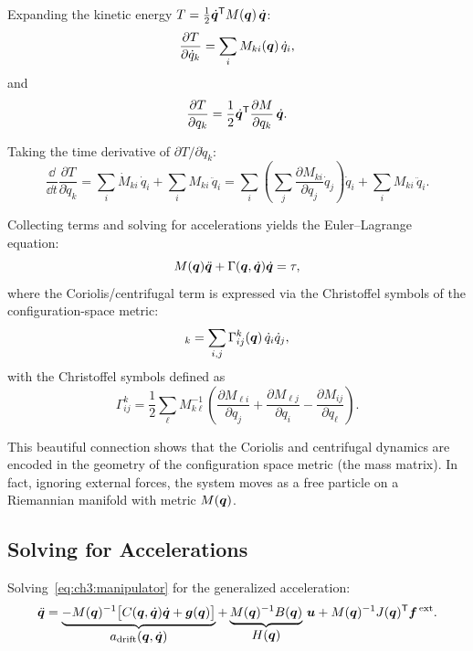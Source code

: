 Expanding the kinetic energy $T = \frac{1}{2}\dot{\bm{q}}^{\mathsf{T}} M(\bm{q})\,\dot{\bm{q}}$:
\begin{equation}
\frac{\partial T}{\partial \dot q_k} = \sum_{i} M_{ki}(\bm{q})\,\dot q_i,
\end{equation}
and
\begin{equation}
\frac{\partial T}{\partial q_k} = \frac{1}{2}\dot{\bm{q}}^{\mathsf{T}} \frac{\partial M}{\partial q_k}\,\dot{\bm{q}}.
\end{equation}

Taking the time derivative of $\partial T/\partial \dot q_k$:
\begin{equation}
\frac{\dd}{\dd t}\frac{\partial T}{\partial \dot q_k} = \sum_i \dot M_{ki}\,\dot q_i
+ \sum_i M_{ki}\,\ddot q_i
= \sum_i \left( \sum_j \frac{\partial M_{ki}}{\partial q_j}\dot q_j \right)\dot q_i
+ \sum_i M_{ki}\,\ddot q_i.
\end{equation}

Collecting terms and solving for accelerations yields the Euler--Lagrange equation:
\begin{equation}
M(\bm{q})\ddot{\bm{q}} + \Gamma(\bm{q},\dot{\bm{q}})\dot{\bm{q}} = \tau,
\end{equation}
where the Coriolis/centrifugal term is expressed via the Christoffel symbols of the
configuration-space metric:
\begin{equation}
[\Gamma(\q,\dot\q)\dot\q]_k = \sum_{i,j} \Gamma^k_{ij}(\q)\,\dot q_i \dot q_j,
\label{eq:ch3:christoffel}
\end{equation}
with the Christoffel symbols defined as
\begin{equation}
\Gamma^k_{ij} = \frac{1}{2} \sum_\ell M^{-1}_{k\ell}
\left( \frac{\partial M_{\ell i}}{\partial q_j} + \frac{\partial M_{\ell j}}{\partial q_i}
- \frac{\partial M_{ij}}{\partial q_\ell} \right).
\label{eq:ch3:christoffel-formula}
\end{equation}

This beautiful connection shows that the Coriolis and centrifugal dynamics are encoded in
the geometry of the configuration space metric (the mass matrix). In fact, ignoring external
forces, the system moves as a free particle on a Riemannian manifold with metric $M(\bm{q})$.

\subsection{Solving for Accelerations}

Solving~\eqref{eq:ch3:manipulator} for the generalized acceleration:
\begin{equation}
\ddot{\bm{q}} = \underbrace{-M(\bm{q})^{-1}\bigl[C(\bm{q},\dot{\bm{q}})\dot{\bm{q}} + \bm{g}(\bm{q})\bigr]}_{
\displaystyle a_{\text{drift}}(\bm{q},\dot{\bm{q}})}
+ \underbrace{M(\bm{q})^{-1}B(\bm{q})}_{
\displaystyle H(\bm{q})}\,\bm{u}
+ M(\bm{q})^{-1}J(\bm{q})^{\mathsf{T}}\bm{f}^{\,\text{ext}}.
\label{eq:ch3:forward-dynamics}
\end{equation}

